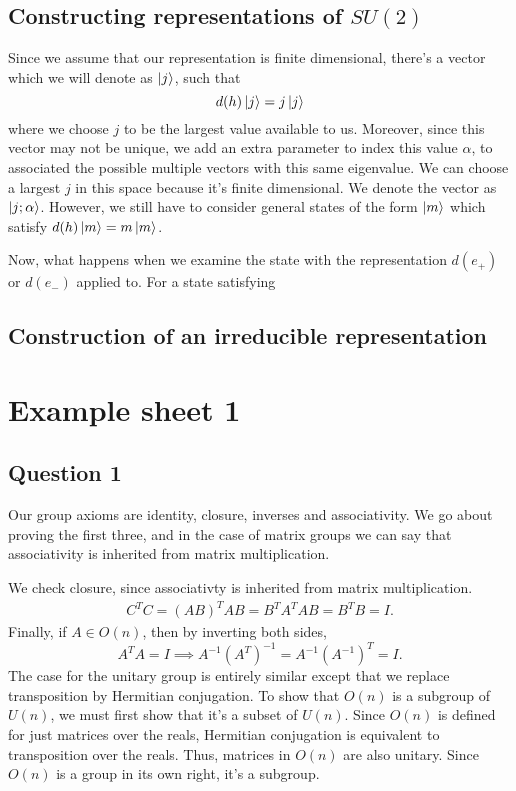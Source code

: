 \documentclass[11pt, oneside]{article}   	%
\theoremstyle{slanted}
\begin{document}
\subsection{ Constructing representations of $SU (2) $}
Since we assume that our representation is finite dimensional, there's a vector which we will denote as $\ket{j} $, such that \[ 
d(h ) \ket{j} = j \ket{ j} \] 
where we choose $j$ to be the largest value available to us. Moreover, since this vector may not be unique, we add an extra parameter to index this value $\alpha$, to associated the possible multiple vectors with this same eigenvalue. We can choose a largest $j$ in this space because it's finite dimensional. We denote the vector as $\ket{ j ; \alpha }$. However, we still have to consider general states of the form $\ket{m}$ which satisfy $d(h)\ket{m} = m \ket{m } $.  

Now, what happens when we examine the state with the representation $d(e_+)$ or $d(e_-) $ applied to. For a state satisfying  
\subsection{Construction of an irreducible representation} 
\pagebreak 
\section{Example sheet 1}

\subsection{Question 1}

Our group axioms are identity, closure, inverses and associativity. 
We go about proving the first three, and in the case of matrix groups 
we can say that associativity is inherited from matrix multiplication. 


We check closure, since associativty is inherited from matrix multiplication.
\begin{align*}
C^T C = (AB)^T AB = B^T A^T A B = B^T B = I. 
\end{align*}
Finally, if $A \in O(n)$, then by inverting both sides, 
\[
A^T A = I \implies A^{-1} (A^T)^{-1} = A^{-1} (A^{-1})^T = I. 
\]
The case for the unitary group is entirely similar except that we replace transposition by Hermitian conjugation. 
To show that $O(n)$ is a subgroup of $U(n)$, we must first show that it's a subset of $U(n)$. Since $O(n)$ is defined for just matrices over the reals, Hermitian conjugation is equivalent to transposition over the reals. Thus, matrices in $O(n)$ are also unitary. Since $O(n)$ is a group in its own right, it's a subgroup. 
\end{document}

